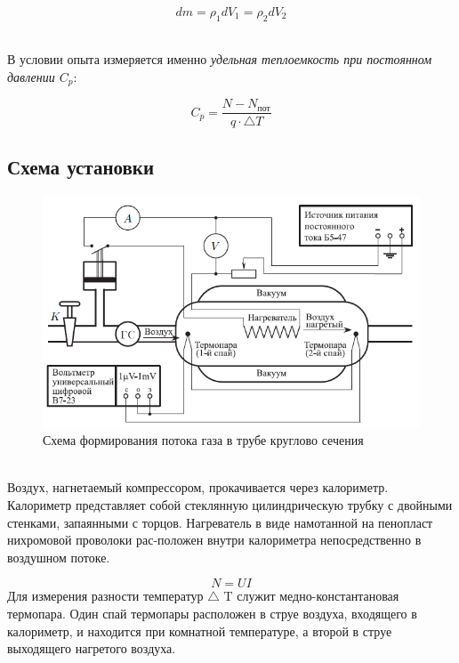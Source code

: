 \documentclass[a4paper,12pt]{article}
\theoremstyle{plain} %
\theoremstyle{definition} %
\theoremstyle{remark} %
\begin{document}
\begin{equation}
dm = \rho_1 dV_1 = \rho_2 dV_2 
\end{equation}\

\indent В условии опыта измеряется именно \textit{удельная теплоемкость при постоянном давлении $C_p$}:

\begin{equation}
C_p = \dfrac{N - N_\text{пот}}{q \cdot \triangle T}
\end{equation}


\subsection{Схема установки}

\begin{figure}\label{pic:sheme}

	\caption{Схема формирования потока газа в трубе круглово сечения}
	\includegraphics[width=\linewidth]{Scheme.png}
	
\end{figure}\
\\[5ex]
\indent Воздух, нагнетаемый компрессором, прокачивается через калориметр. Калориметр представляет собой стеклянную цилиндрическую трубку с двойными стенками, запаянными с торцов. Нагреватель в виде намотанной на пенопласт нихромовой проволоки рас-положен внутри калориметра непосредственно в воздушном потоке.

\begin{equation}
N = UI
\end{equation}
Для измерения разности температур $\triangle$ T служит медно-константановая термопара. Один спай термопары расположен в струе воздуха, входящего в калориметр, и находится при комнатной температуре, а второй в струе выходящего нагретого воздуха.
\end{document}
